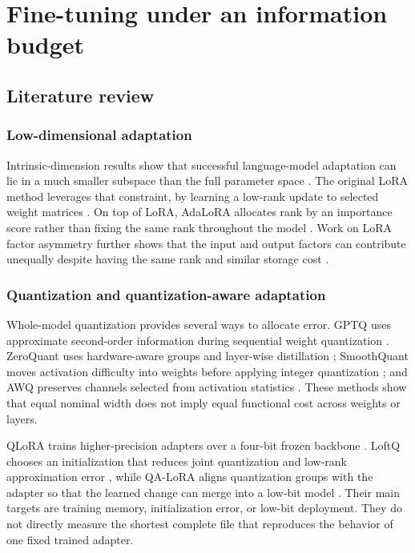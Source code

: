 \section{Fine-tuning under an information budget}
\label{sec:fineqcomp}

\subsection{Literature review}

\subsubsection{Low-dimensional adaptation}

  Intrinsic-dimension results show that successful language-model adaptation can lie in a much smaller subspace than the full parameter space \parencite{aghajanyan2021intrinsic}. The original LoRA method leverages that constraint, by learning a low-rank update to selected weight matrices \parencite{hu2022lora}. On top of LoRA, AdaLoRA allocates rank by an importance score rather than fixing the same rank throughout the model \parencite{zhang2023adalora}. Work on LoRA factor asymmetry further shows that the input and output factors can contribute unequally despite having the same rank and similar storage cost \parencite{zhu2024asymmetry}.

\subsubsection{Quantization and quantization-aware adaptation}

Whole-model quantization provides several ways to allocate error. GPTQ uses approximate second-order information during sequential weight quantization \parencite{frantar2023gptq}. ZeroQuant uses hardware-aware groups and layer-wise distillation \parencite{yao2022zeroquant}; SmoothQuant moves activation difficulty into weights before applying integer quantization \parencite{xiao2023smoothquant}; and AWQ preserves channels selected from activation statistics \parencite{lin2024awq}. These methods show that equal nominal width does not imply equal functional cost across weights or layers.

QLoRA trains higher-precision adapters over a four-bit frozen backbone \parencite{dettmers2023qlora}. LoftQ chooses an initialization that reduces joint quantization and low-rank approximation error \parencite{li2024loftq}, while QA-LoRA aligns quantization groups with the adapter so that the learned change can merge into a low-bit model \parencite{xu2024qalora}. Their main targets are training memory, initialization error, or low-bit deployment. They do not directly measure the shortest complete file that reproduces the behavior of one fixed trained adapter.


